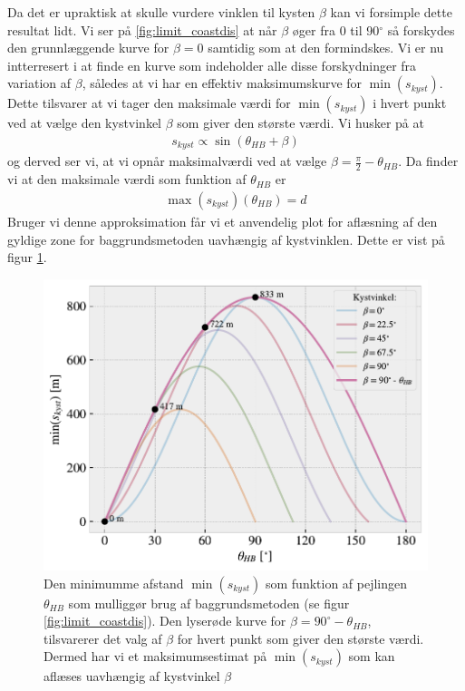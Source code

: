 \documentclass[%
 reprint,
nofootinbib,
aps,
]{revtex4-1}
\begin{document}
Da det er upraktisk at skulle vurdere vinklen til kysten $\beta$ kan vi forsimple dette resultat lidt. Vi ser på \ref{fig:limit_coastdis} at når $\beta$ øger fra 0 til 90$^{\circ}$ så forskydes den grunnlæggende kurve for $\beta = 0$ samtidig som at den formindskes. Vi er nu intterresert i at finde en kurve som indeholder alle disse forskydninger fra variation af $\beta$, således at vi har en effektiv maksimumskurve for $\min{(s_{kyst})}$. Dette tilsvarer at vi tager den maksimale værdi for $\min{(s_{kyst})}$ i hvert punkt ved at vælge den kystvinkel $\beta$ som giver den største værdi. Vi husker på at
\begin{align*}
  s_{kyst} \propto \sin{(\theta_{HB} + \beta)}
\end{align*}
og derved ser vi, at vi opnår maksimalværdi ved at vælge $\beta = \frac{\pi}{2} - \theta_{HB}$. Da finder vi at den maksimale værdi som funktion af $\theta_{HB}$ er
\begin{align}
  \max{(s_{kyst})}(\theta_{HB}) = d
  \label{eq:max_s_kyst}
\end{align}
Bruger vi denne approksimation får vi et anvendelig plot for aflæsning af den gyldige zone for baggrundsmetoden uavhængig af kystvinklen. Dette er vist på figur \ref{fig:limit_coastdis_betamax}.
\begin{figure}[H]
  \includegraphics[width=\linewidth]{figures/limit_coastdis_betamax.pdf}
  \caption{Den minimumme afstand $\min{(s_{kyst})}$ som funktion af pejlingen $\theta_{HB}$ som mulliggør brug af baggrundsmetoden (se figur \ref{fig:limit_coastdis}). Den lyserøde kurve for $\beta = 90^{\circ} - \theta_{HB}$, tilsvarerer det valg af $\beta$ for hvert punkt som giver den største værdi. Dermed har vi et maksimumsestimat på $\min{(s_{kyst})}$ som kan aflæses uavhængig af kystvinkel $\beta$ }
  \label{fig:limit_coastdis_betamax}
\end{figure}
\end{document}
